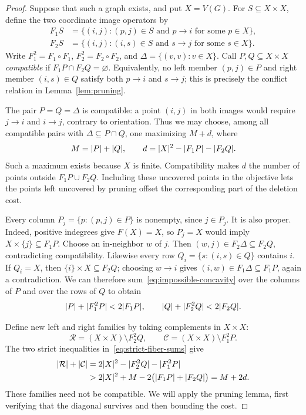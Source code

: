 \begin{proof}
Suppose that such a graph exists, and put $X=V(G)$.  For $S\subseteq X\times X$,
define the two coordinate image operators by
\[
 \begin{aligned}
 F_1S&=\{(i,j): (p,j)\in S\text{ and }p\to i
                     \text{ for some }p\in X\},\\
 F_2S&=\{(i,j): (i,s)\in S\text{ and }s\to j
                     \text{ for some }s\in X\}.
 \end{aligned}
\]
Write $F_1^2=F_1\circ F_1$, $F_2^2=F_2\circ F_2$, and
$\Delta=\{(v,v):v\in X\}$.  Call $P,Q\subseteq X\times X$ \emph{compatible}
if $F_1P\cap F_2Q=\varnothing$.  Equivalently, no left member $(p,j)\in P$
and right member $(i,s)\in Q$ satisfy both $p\to i$ and $s\to j$; this is
precisely the conflict relation in Lemma~\ref{lem:pruning}.

The pair $P=Q=\Delta$ is compatible: a point $(i,j)$ in both images would
require $j\to i$ and $i\to j$, contrary to orientation.  Thus we may choose,
among all compatible pairs with $\Delta\subseteq P\cap Q$, one maximizing
$M+d$, where
\[
 M=\lvert P\rvert+\lvert Q\rvert,\qquad
 d=\lvert X\rvert^2-\lvert F_1P\rvert-\lvert F_2Q\rvert.
\]
Such a maximum exists because $X$ is finite.  Compatibility makes $d$ the
number of points outside $F_1P\cup F_2Q$.  Including these uncovered points
in the objective lets the points left uncovered by pruning offset the
corresponding part of the deletion cost.

Every column $P_j=\{p:(p,j)\in P\}$ is nonempty, since $j\in P_j$.
It is also proper.  Indeed, positive indegrees give $F(X)=X$, so $P_j=X$
would imply $X\times\{j\}\subseteq F_1P$.  Choose an in-neighbor $w$ of
$j$.  Then $(w,j)\in F_2\Delta\subseteq F_2Q$, contradicting compatibility.
Likewise every row $Q_i=\{s:(i,s)\in Q\}$ contains $i$.  If $Q_i=X$,
then $\{i\}\times X\subseteq F_2Q$; choosing $w\to i$ gives
$(i,w)\in F_1\Delta\subseteq F_1P$, again a contradiction.
We can therefore sum~\eqref{eq:impossible-concavity} over the columns of $P$
and over the rows of $Q$ to obtain
\begin{equation}\label{eq:strict-fiber-sums}
 \lvert P\rvert+\lvert F_1^2P\rvert<2\lvert F_1P\rvert,\qquad
 \lvert Q\rvert+\lvert F_2^2Q\rvert<2\lvert F_2Q\rvert.
\end{equation}

Define new left and right families by taking complements in $X\times X$:
\[
 \mathcal R=(X\times X)\setminus F_2^2Q,
 \qquad
 \mathcal C=(X\times X)\setminus F_1^2P.
\]
The two strict inequalities in~\eqref{eq:strict-fiber-sums} give
\begin{equation}\label{eq:complement-gain}
 \begin{aligned}
 \lvert \mathcal R\rvert+\lvert \mathcal C\rvert
 &=2\lvert X\rvert^2-\lvert F_2^2Q\rvert-\lvert F_1^2P\rvert\\
 &>2\lvert X\rvert^2+M-2\bigl(\lvert F_1P\rvert+\lvert F_2Q\rvert\bigr)
 =M+2d.
 \end{aligned}
\end{equation}
These families need not be compatible.  We will apply the pruning lemma,
first verifying that the diagonal survives and then bounding the cost.



\end{proof}
